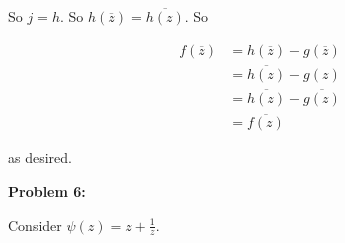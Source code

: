 \documentclass[a4paper,12pt]{article}
\begin{document}
So $j=h$. So $h(\overline{z}) = \overline{h(z)}$. So 

\begin{align*}
f(\overline{z}) &= h(\overline{z}) - g(\overline{z})\\
&= \overline{h(z)} - g(z)\\
&= \overline{h(z)} - \overline{g(z)}\\
&= \overline{f(z)}
\end{align*}

as desired.

\shunt

{\bf Problem 6:}

Consider $\psi(z) = z + \frac{1}{z}$. 

\shunt
\end{document}
